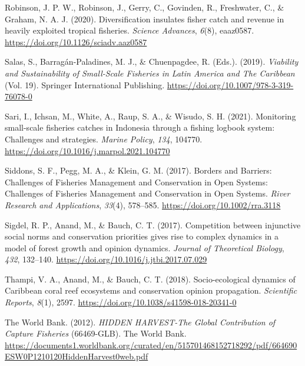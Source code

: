 \documentclass[
  12pt,
]{article}
\newlength{\cslhangindent}
\newlength{\cslentryspacingunit} %
\newenvironment{CSLReferences}[2] %
 {%
  \setlength{\parindent}{0pt}
  \ifodd #1
  \let\oldpar\par
  \def\par{\hangindent=\cslhangindent\oldpar}
  \fi
  \setlength{\parskip}{#2\cslentryspacingunit}
 }%
 {}
\begin{document}
\begin{CSLReferences}{1}{2}
\leavevmode{}%
Robinson, J. P. W., Robinson, J., Gerry, C., Govinden, R., Freshwater, C., \& Graham, N. A. J. (2020). Diversification insulates fisher catch and revenue in heavily exploited tropical fisheries. \emph{Science Advances}, \emph{6}(8), eaaz0587. \url{https://doi.org/10.1126/sciadv.aaz0587}

\leavevmode{}%
Salas, S., Barragán-Paladines, M. J., \& Chuenpagdee, R. (Eds.). (2019). \emph{Viability and {Sustainability} of {Small-Scale Fisheries} in {Latin America} and {The Caribbean}} (Vol. 19). {Springer International Publishing}. \url{https://doi.org/10.1007/978-3-319-76078-0}

\leavevmode{}%
Sari, I., Ichsan, M., White, A., Raup, S. A., \& Wisudo, S. H. (2021). Monitoring small-scale fisheries catches in {Indonesia} through a fishing logbook system: {Challenges} and strategies. \emph{Marine Policy}, \emph{134}, 104770. \url{https://doi.org/10.1016/j.marpol.2021.104770}

\leavevmode{}%
Siddons, S. F., Pegg, M. A., \& Klein, G. M. (2017). Borders and {Barriers}: Challenges of {Fisheries Management} and {Conservation} in {Open Systems}: {Challenges} of {Fisheries Management} and {Conservation} in {Open Systems}. \emph{River Research and Applications}, \emph{33}(4), 578--585. \url{https://doi.org/10.1002/rra.3118}

\leavevmode{}%
Sigdel, R. P., Anand, M., \& Bauch, C. T. (2017). Competition between injunctive social norms and conservation priorities gives rise to complex dynamics in a model of forest growth and opinion dynamics. \emph{Journal of Theoretical Biology}, \emph{432}, 132--140. \url{https://doi.org/10.1016/j.jtbi.2017.07.029}

\leavevmode{}%
Thampi, V. A., Anand, M., \& Bauch, C. T. (2018). Socio-ecological dynamics of {Caribbean} coral reef ecosystems and conservation opinion propagation. \emph{Scientific Reports}, \emph{8}(1), 2597. \url{https://doi.org/10.1038/s41598-018-20341-0}

\leavevmode{}%
The World Bank. (2012). \emph{{HIDDEN} {HARVEST}-{The} {Global} {Contribution} of {Capture} {Fisheries}} (66469-GLB). The World Bank. \url{https://documents1.worldbank.org/curated/en/515701468152718292/pdf/664690ESW0P1210120HiddenHarvest0web.pdf}


\end{CSLReferences}
\end{document}
